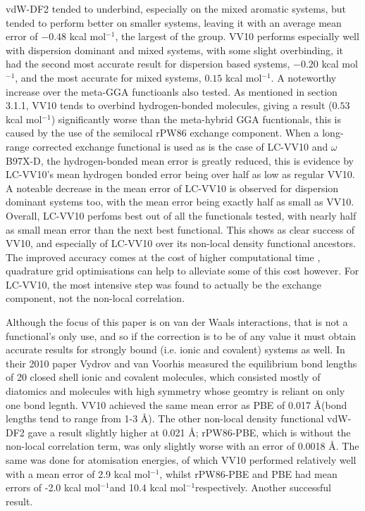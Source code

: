 \documentclass[10pt,a4paper,twocolumn,twoside]{extarticle}
\newcommand{\kcal}{kcal mol\(^{-1}\)}
\newcommand{\oA}{\si{\angstrom}}
\begin{document}
	vdW-DF2 tended to underbind, especially on the mixed aromatic systems, but tended to perform better on smaller systems, leaving it with an average mean error of $-0.48$ \kcal, the largest of the group. VV10 performs especially well with dispersion dominant and mixed systems, with some slight overbinding, it had the second most accurate result for dispersion based systems, $-0.20$ \kcal, and the most accurate for mixed systems, $0.15$ \kcal. A noteworthy increase over the meta-GGA functioanls also tested. As mentioned in section 3.1.1, VV10 tends to overbind hydrogen-bonded molecules, giving a result ($0.53$ \kcal) significantly worse than the meta-hybrid GGA fucntionals, this is caused by the use of the semilocal rPW86 exchange component. When a long-range corrected exchange functional is used as is the case of LC-VV10 and $\omega$B97X-D, the hydrogen-bonded mean error is greatly reduced, this is evidence by LC-VV10's mean hydrogen bonded error being over half as low as regular VV10. 
	A noteable decrease in the mean error of LC-VV10 is observed for dispersion dominant systems too, with the mean error being exactly half as small as VV10. Overall, LC-VV10 perfoms best out of all the functionals tested, with nearly half as small mean error than the next best functional. This shows as clear success of VV10, and especially of LC-VV10 over its non-local density functional ancestors. The improved accuracy comes at the cost of higher computational time \cite{vydrov2008-vdw-comparisons}, quadrature grid optimisations can help to alleviate some of this cost however. For LC-VV10, the most intensive step was found to actually be the exchange component, not the non-local correlation.

	Although the focus of this paper is on van der Waals interactions, that is not a functional's only use, and so if the correction is to be of any value it must obtain accurate results for strongly bound (i.e. ionic and covalent) systems as well. In their 2010 paper Vydrov and van Voorhis\cite{Vydrov2010} measured the equilibrium bond lengths\cite{physvals} of 20 closed shell ionic and covalent molecules, which consisted mostly of diatomics and molecules with high symmetry whose geomtry is reliant on only one bond legnth. VV10 achieved the same mean error as PBE of 0.017 \oA (bond lengths tend to range from 1-3 \oA). The other non-local density functional vdW-DF2 gave a result slightly higher at 0.021 \oA; rPW86-PBE, which is without the non-local correlation term, was only slightly worse with an error of 0.0018 \oA. The same was done for atomisation energies\cite{atomisationvals}, of which VV10 performed relatively well with a mean error of 2.9 \kcal, whilst rPW86-PBE and PBE had mean errors of -2.0 \kcal and 10.4 \kcal respectively. Another successful result. 
\end{document}
